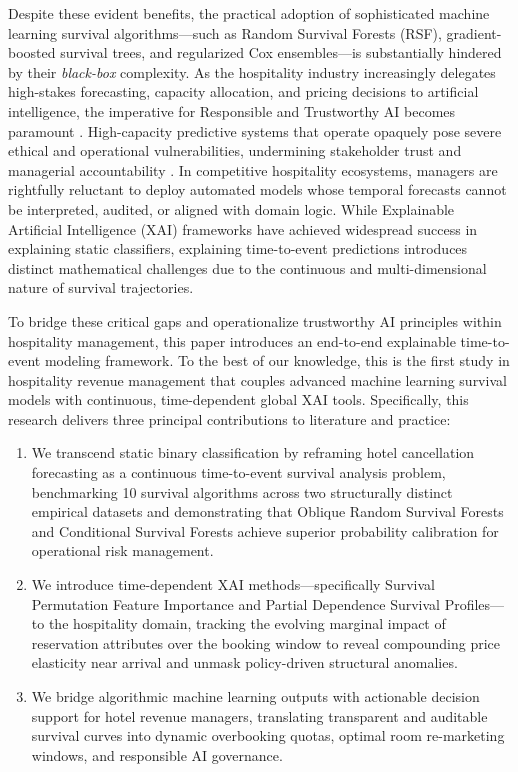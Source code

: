 \documentclass[pdflatex,sn-mathphys-ay]{sn-jnl}%
\theoremstyle{thmstyleone}%
\theoremstyle{thmstyletwo}%
\theoremstyle{thmstylethree}%
\begin{document}
Despite these evident benefits, the practical adoption of sophisticated machine learning survival algorithms—such as Random Survival Forests (RSF), gradient-boosted survival trees, and regularized Cox ensembles—is substantially hindered by their \textit{black-box} complexity. As the hospitality industry increasingly delegates high-stakes forecasting, capacity allocation, and pricing decisions to artificial intelligence, the imperative for Responsible and Trustworthy AI becomes paramount \citep{khan2025artificial}. High-capacity predictive systems that operate opaquely pose severe ethical and operational vulnerabilities, undermining stakeholder trust and managerial accountability \citep{thiebes2021trustworthy, meske2022explainable}. In competitive hospitality ecosystems, managers are rightfully reluctant to deploy automated models whose temporal forecasts cannot be interpreted, audited, or aligned with domain logic. While Explainable Artificial Intelligence (XAI) frameworks have achieved widespread success in explaining static classifiers, explaining time-to-event predictions introduces distinct mathematical challenges due to the continuous and multi-dimensional nature of survival trajectories.

To bridge these critical gaps and operationalize trustworthy AI principles within hospitality management, this paper introduces an end-to-end explainable time-to-event modeling framework. To the best of our knowledge, this is the first study in hospitality revenue management that couples advanced machine learning survival models with continuous, time-dependent global XAI tools. Specifically, this research delivers three principal contributions to literature and practice:
\begin{enumerate}
\item We transcend static binary classification by reframing hotel cancellation forecasting as a continuous time-to-event survival analysis problem, benchmarking 10 survival algorithms across two structurally distinct empirical datasets and demonstrating that Oblique Random Survival Forests and Conditional Survival Forests achieve superior probability calibration for operational risk management.
\item We introduce time-dependent XAI methods—specifically Survival Permutation Feature Importance and Partial Dependence Survival Profiles—to the hospitality domain, tracking the evolving marginal impact of reservation attributes over the booking window to reveal compounding price elasticity near arrival and unmask policy-driven structural anomalies.
\item We bridge algorithmic machine learning outputs with actionable decision support for hotel revenue managers, translating transparent and auditable survival curves into dynamic overbooking quotas, optimal room re-marketing windows, and responsible AI governance.
\end{enumerate}
\end{document}
